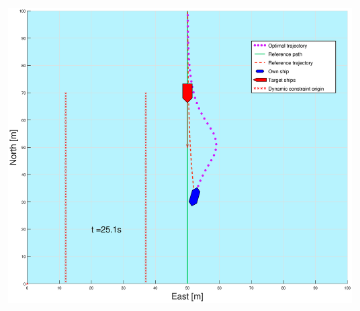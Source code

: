 \begin{figure}[!b]
\begin{subfigure}[b]{0.49\textwidth}
    \end{subfigure}
    \hfill
    \begin{subfigure}[b]{0.499\textwidth}
        \centering
        \includegraphics[width=\textwidth]{Images/Figures/enkel_HO/_Simple_0fig999_time=25}
    \end{subfigure}
    \hfill
\end{figure}%
